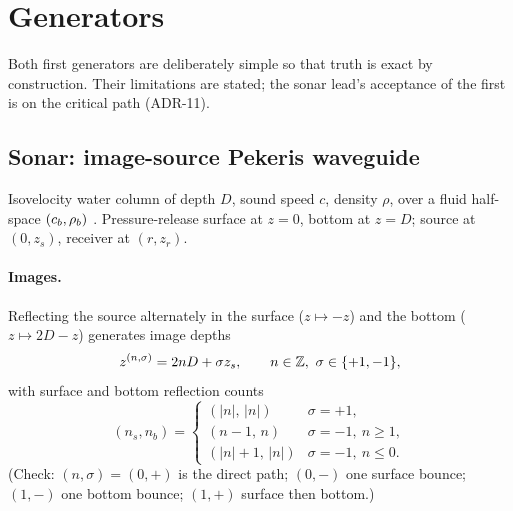 \section{Generators}
\label{sec:generators}

Both first generators are deliberately simple so that truth is exact by construction. Their limitations are stated; the sonar lead's acceptance of the first is on the critical path (ADR-11).

\subsection[Sonar: image-source Pekeris waveguide]{Sonar: image-source Pekeris waveguide\hfill{\normalfont\small \tagP{}}}
\label{sec:pekeris}

Isovelocity water column of depth $D$, sound speed $c$, density $\rho$, over a fluid half-space $(c_{b},\rho_{b})$ \citep{pekeris1948,jensen2011}. Pressure-release surface at $z=0$, bottom at $z=D$; source at $(0,z_s)$, receiver at $(r,z_r)$.

\paragraph{Images.} Reflecting the source alternately in the surface ($z\mapsto -z$) and the bottom ($z\mapsto 2D-z$) generates image depths
\begin{equation}
  z^{(n,\sigma)} = 2nD + \sigma z_s,\qquad n\in\mathbb{Z},\ \sigma\in\{+1,-1\},
  \label{eq:images}
\end{equation}
with surface and bottom reflection counts
\begin{equation}
  (n_s,n_b) =
  \begin{cases}
    (|n|,\,|n|) & \sigma=+1,\\
    (n-1,\,n) & \sigma=-1,\ n\ge1,\\
    (|n|+1,\,|n|) & \sigma=-1,\ n\le0 .
  \end{cases}
  \label{eq:counts}
\end{equation}
(Check: $(n,\sigma)=(0,+)$ is the direct path; $(0,-)$ one surface bounce; $(1,-)$ one bottom bounce; $(1,+)$ surface then bottom.)

